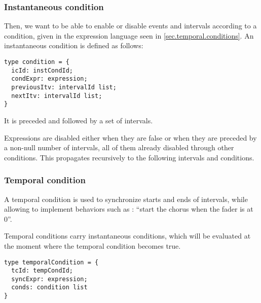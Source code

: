 \documentclass{article}
\begin{document}
\subsubsection{Instantaneous condition}
Then, we want to be able to enable or disable events and intervals according to a condition, given in the expression language seen in \ref{sec.temporal.conditions}. An instantaneous condition is defined as follows: 

\begin{lstlisting}
type condition = {
  icId: instCondId;
  condExpr: expression;
  previousItv: intervalId list;
  nextItv: intervalId list;
}
\end{lstlisting}
It is preceded and followed by a set of intervals.

Expressions are disabled either when they are false or when they are preceded by a non-null number of intervals, all of them already disabled through other conditions. This propagates recursively to the following intervals and conditions. 

\subsubsection{Temporal condition}
A temporal condition is used to synchronize starts and ends of intervals, while allowing to implement behaviors such as : ``start the chorus when the fader is at 0''.

Temporal conditions carry instantaneous conditions, which will be evaluated at the moment where the temporal condition becomes true.


\begin{lstlisting}
type temporalCondition = {
  tcId: tempCondId;
  syncExpr: expression;
  conds: condition list
}
\end{lstlisting}
\end{document}
